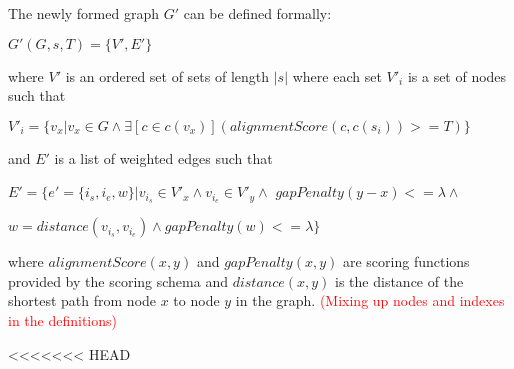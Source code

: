 \documentclass{article}
\begin{document}
\par\noindent
The newly formed graph $G'$ can be defined formally:\\
\par
$G'(G, s, T) = \{V', E'\}$\\
\par\noindent
where $V'$ is an ordered set of sets of length $|s|$ where each set $V'_i$ is a set of nodes such that\\
\par
$V'_i=\{v_x|v_x \in G \land \exists [c \in c(v_x)](alignmentScore(c, c(s_i)) >= T)\}$\\
\par\noindent
and $E'$ is a list of weighted edges such that\\
\par
$E'=\{e'=\{i_s, i_e, w\}|v_{i_s} \in V'_x \wedge v_{i_e} \in V'_y \wedge$ $gapPenalty(y - x) <= \lambda \wedge $\par$w=distance(v_{i_s}, v_{i_e}) \wedge gapPenalty(w) <= \lambda\}$\\
\par\noindent
where $alignmentScore(x, y)$ and $gapPenalty(x, y)$ are scoring functions provided by the scoring schema and $distance(x, y)$ is the distance of the shortest path from node $x$ to node $y$ in the graph. \textcolor{red}{(Mixing up nodes and indexes in the definitions)}\\
\par\noindent
<<<<<<< HEAD
\end{document}
